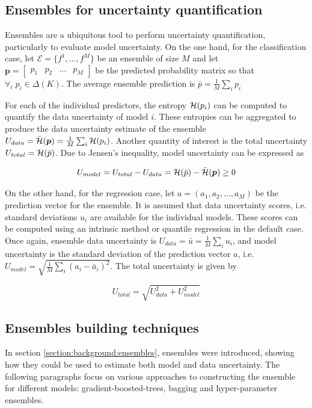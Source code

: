 \subsection{Ensembles for uncertainty quantification} \label{model:uq-ensembles}
Ensembles are a ubiquitous tool to perform uncertainty quantification, particularly to evaluate model uncertainty. On the one hand, for the classification case, let $\mathcal{E} = \{f^1, \ldots, f^M\}$ be an ensemble of size $M$ and let $\boldsymbol{p}=\begin{bmatrix} p_{1} & p_{2} & \hdots & p_{M} \end{bmatrix}$ be the predicted probability matrix so that $\forall_i \;p_i \in \Delta(K)$. The average ensemble prediction is 
$
\bar p = \frac{1}{M} \sum_{i} p_i
$

For each of the individual predictors, the entropy $\operatorname{\mathcal{H}}(p_i)$ can be computed to quantify the data uncertainty of model $i$. These entropies can be aggregated to produce the data uncertainty estimate of the ensemble $U_{data} = \Bar{\operatorname{\mathcal{H}}}(\boldsymbol{p})=\frac{1}{M} \sum_i \operatorname{\mathcal{H}}(p_i)$. Another quantity of interest is the total uncertainty $U_{total} = \operatorname{\mathcal{H}}(\bar p)$. Due to Jensen's inequality, model uncertainty can be expressed as

$$
U_{model} = U_{total} - U_{data} = \operatorname{\mathcal{H}}(\bar p) - \Bar{\operatorname{\mathcal{H}}}(\boldsymbol{p}) \geq 0
$$

On the other hand, for the regression case, let $a = (a_1, a_2, \ldots, a_M)$ be the prediction vector for the ensemble. It is assumed that data uncertainty scores, i.e. standard deviations $u_i$ are available for the individual models. These scores can be computed using an intrinsic method or quantile regression in the default case. Once again, ensemble data uncertainty is $U_{data} = \bar u = \frac{1}{M} \sum_i u_i$, and model uncertainty is the standard deviation of the prediction vector $a$, i.e. $U_{model} = \sqrt{\frac{1}{M} \sum_i (a_i - \bar a_i)^2}$. The total uncertainty is given by 

$$U_{total} = \sqrt{U_{data}^2 + U_{model}^2}$$

\subsection{Ensembles building techniques} \label{model:ensembles}

In section \ref{section:background:ensembles}, ensembles were introduced, showing how they could be used to estimate both model and data uncertainty. The following paragraphs focus on various approaches to constructing the ensemble for different models: gradient-boosted-trees, bagging and hyper-parameter ensembles.

